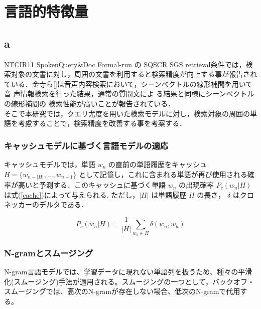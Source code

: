 \chapter{言語的特徴量}

\section{a}


NTCIR11 SpokenQuery\&Doc Formal-run の SQSCR SGS retrieval条件では，検索対象の文書に対し，周囲の文書を利用すると検索精度が向上する事が報告されている．金寺ら[]は音声内容検索において，シーンべクトルの線形補間を用いて音
声情報検索を行った結果，通常の質問文によ
る結果と同様にシーンべクトルの線形補間の
検索性能が高いことが報告されている． \\
そこで本研究では，クエリ尤度を用いた検索モデルに対し，検索対象の周囲の単語を考慮することで，検索精度を改善する事を考案する．




\subsection{キャッシュモデルに基づく言語モデルの適応}
キャッシュモデルでは，単語 $w_n$ の直前の単語履歴をキャッシュ $H = \{ w_{n-|H|}, ..., w_{n-1}\} $ として記憶し，これに含まれる単語が再び使用される確率が高いと予測する．このキャッシュに基づく単語 $w_n$ の出現確率 $P_c(w_n|H)$ は式(\ref{cache})によって与えられる. ただし，$|H|$ は単語履歴 $H$ の長さ， $\delta$ はクロネッカーのデルタである．

\begin{equation}
		P_c(w_n|H) = \frac{1}{|H|} \sum_{w_h \in H} \delta (w_n, w_h)
    \label{cache}
\end{equation}

\subsection{N-gramとスムージング}

N-gram言語モデルでは、学習データに現れない単語列を扱うため、種々の平滑化(スムージング)手法が適用される。スムージングの一つとして，バックオフ・スムージングでは、高次のN-gramが存在しない場合、低次のN-gramで代用する。

